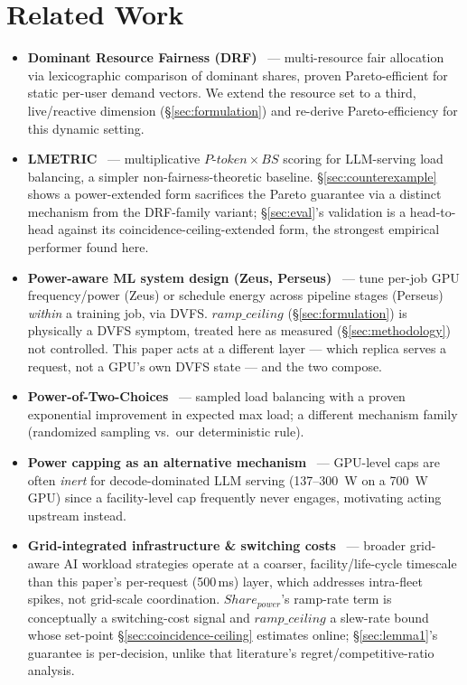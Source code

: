 \documentclass[sigconf,review,anonymous]{acmart}
\begin{document}
\vspace{-8pt}
\section{Related Work}
\label{sec:relatedwork}

\begin{itemize}
  \item \textbf{Dominant Resource Fairness (DRF)}~\cite{ghodsi2011drf} --- multi-resource fair
    allocation via lexicographic comparison of dominant shares, proven Pareto-efficient for
    static per-user demand vectors. We extend the resource set to a third, live/reactive
    dimension (\S\ref{sec:formulation}) and re-derive Pareto-efficiency for this dynamic
    setting.
  \item \textbf{LMETRIC}~\cite{zhang2026lmetric} --- multiplicative $\mathit{P\text{-}token}
    \times \mathit{BS}$ scoring for LLM-serving load balancing, a simpler non-fairness-theoretic
    baseline. \S\ref{sec:counterexample} shows a power-extended form sacrifices the Pareto
    guarantee via a distinct mechanism from the DRF-family variant; \S\ref{sec:eval}'s
    validation is a head-to-head against its coincidence-ceiling-extended form, the strongest
    empirical performer found here.
  \item \textbf{Power-aware ML system design (Zeus, Perseus)}~\cite{you2023zeus,
    chung2024perseus} --- tune per-job GPU frequency/power (Zeus) or schedule energy across
    pipeline stages (Perseus) \emph{within} a training job, via DVFS. $\mathit{ramp\_ceiling}$
    (\S\ref{sec:formulation}) is physically a DVFS symptom, treated here as measured
    (\S\ref{sec:methodology}) not controlled. This paper acts at a different layer --- which
    replica serves a request, not a GPU's own DVFS state --- and the two compose.
  \item \textbf{Power-of-Two-Choices}~\cite{mitzenmacher2001power,azar1994balanced} ---
    sampled load balancing with a proven exponential improvement in expected max load; a
    different mechanism family (randomized sampling vs.\ our deterministic rule).
  \item \textbf{Power capping as an alternative mechanism}~\cite{ma2026illusion} --- GPU-level
    caps are often \emph{inert} for decode-dominated LLM serving (137--300~W on a 700~W GPU)
    since a facility-level cap frequently never engages, motivating acting upstream instead.
  \item \textbf{Grid-integrated infrastructure \& switching costs}~\cite{chien2026sustainability,
    li2025fairness, astrom2008feedback} --- broader grid-aware AI workload strategies operate
    at a coarser, facility/life-cycle timescale than this paper's per-request (500\,ms) layer,
    which addresses intra-fleet spikes, not grid-scale coordination. $\mathit{Share_{power}}$'s
    ramp-rate term is conceptually a switching-cost signal and $\mathit{ramp\_ceiling}$ a
    slew-rate bound whose set-point \S\ref{sec:coincidence-ceiling} estimates online;
    \S\ref{sec:lemma1}'s guarantee is per-decision, unlike that literature's
    regret/competitive-ratio analysis.
\end{itemize}
\end{document}
